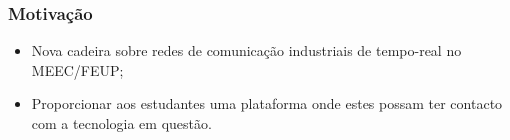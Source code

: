 \begin{frame}
	\frametitle{Motivaç\~{a}o}
	\begin{itemize}
		\item Nova cadeira sobre redes de comunicaç\~{a}o industriais de tempo-real no MEEC/FEUP;
		\item Proporcionar aos estudantes uma plataforma onde estes possam ter contacto com a tecnologia em quest\~{a}o.
	\end{itemize}
\end{frame}

